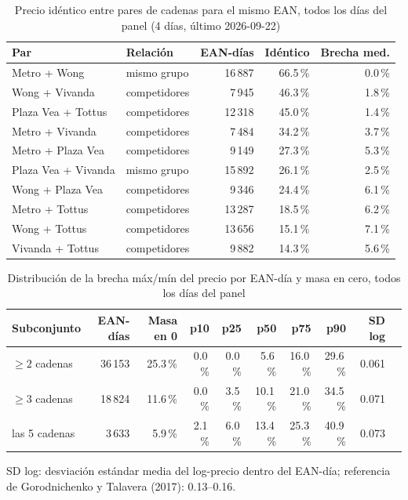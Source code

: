 
\begin{table}[htbp]
\caption{Precio id\'entico entre pares de cadenas para el mismo EAN, todos los d\'ias del panel (4 d\'ias, \'ultimo 2026-09-22)}
\label{tab:identidad}
\centering\scriptsize\setlength{\tabcolsep}{3pt}
\begin{tabular}{@{}llrrr@{}}
\toprule
Par & Relaci\'on & EAN-d\'ias & Id\'entico & Brecha med. \\
\midrule
Metro + Wong & mismo grupo & 16\,887 & 66.5\,\% & 0.0\,\% \\
Wong + Vivanda & competidores & 7\,945 & 46.3\,\% & 1.8\,\% \\
Plaza Vea + Tottus & competidores & 12\,318 & 45.0\,\% & 1.4\,\% \\
Metro + Vivanda & competidores & 7\,484 & 34.2\,\% & 3.7\,\% \\
Metro + Plaza Vea & competidores & 9\,149 & 27.3\,\% & 5.3\,\% \\
Plaza Vea + Vivanda & mismo grupo & 15\,892 & 26.1\,\% & 2.5\,\% \\
Wong + Plaza Vea & competidores & 9\,346 & 24.4\,\% & 6.1\,\% \\
Metro + Tottus & competidores & 13\,287 & 18.5\,\% & 6.2\,\% \\
Wong + Tottus & competidores & 13\,656 & 15.1\,\% & 7.1\,\% \\
Vivanda + Tottus & competidores & 9\,882 & 14.3\,\% & 5.6\,\% \\
\bottomrule\end{tabular}\end{table}

\begin{table}[t]
\caption{Distribuci\'on de la brecha m\'ax/m\'in del precio por EAN-d\'ia y masa en cero, todos los d\'ias del panel}
\label{tab:brecha}
\centering\scriptsize\setlength{\tabcolsep}{4pt}
\begin{tabular}{@{}lrrrrrrrrr@{}}
\toprule
Subconjunto & EAN-d\'ias & Masa en 0 & p10 & p25 & p50 & p75 & p90 & SD log \\
\midrule
$\geq 2$ cadenas & 36\,153 & 25.3\,\% & 0.0\,\% & 0.0\,\% & 5.6\,\% & 16.0\,\% & 29.6\,\% & 0.061 \\
$\geq 3$ cadenas & 18\,824 & 11.6\,\% & 0.0\,\% & 3.5\,\% & 10.1\,\% & 21.0\,\% & 34.5\,\% & 0.071 \\
las 5 cadenas & 3\,633 & 5.9\,\% & 2.1\,\% & 6.0\,\% & 13.4\,\% & 25.3\,\% & 40.9\,\% & 0.073 \\
\bottomrule\end{tabular}
\par\smallskip\raggedright\scriptsize SD log: desviaci\'on est\'andar media del log-precio dentro del EAN-d\'ia; referencia de Gorodnichenko y Talavera (2017): 0.13--0.16.
\end{table}

